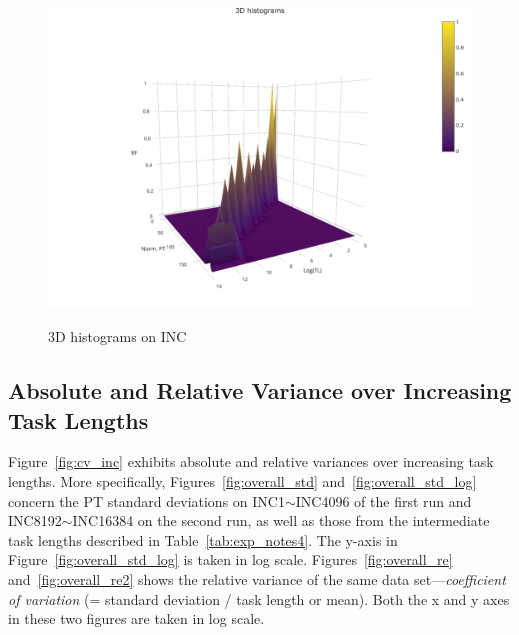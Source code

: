 \begin{figure}[htp!]
\vspace{-.3in}
	\centering
	\includegraphics[scale=0.6]{u_s_time/new_3d_plot}\label{fig:3d_plot}
	\caption{3D histograms on INC~\label{fig:hist3d}}
\end{figure}

\clearpage
\pagebreak

\subsection{Absolute and Relative Variance over Increasing Task Lengths}
Figure~\ref{fig:cv_inc} exhibits absolute and relative variances over increasing task lengths. 
More specifically, Figures~\ref{fig:overall_std} and~\ref{fig:overall_std_log} 
concern the PT standard deviations on INC1$\sim$INC4096 of the first run and 
INC8192$\sim$INC16384 on the second run, as well as those from 
the intermediate task lengths described in Table~\ref{tab:exp_notes4}. 
The y-axis in Figure~\ref{fig:overall_std_log} is taken in log scale.
Figures~\ref{fig:overall_re} and~\ref{fig:overall_re2} shows 
the relative variance of the same data set---{\em coefficient of variation} (= standard deviation 
/ task length or mean). Both the x and y axes in these two figures are taken in log scale.

